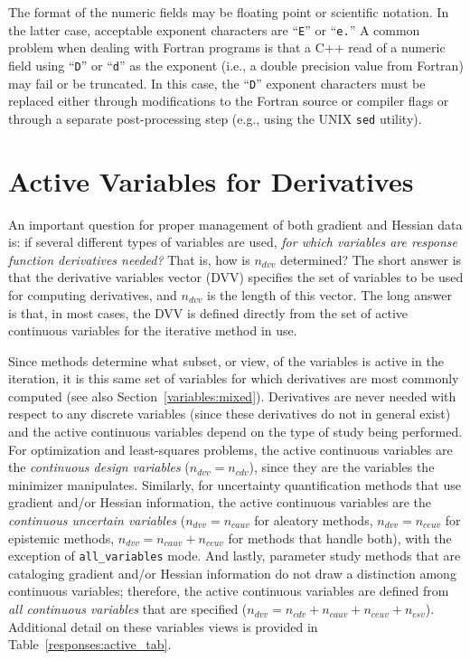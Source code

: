 The format of the numeric fields may be floating point or scientific
notation. In the latter case, acceptable exponent characters are
``\texttt{E}'' or ``\texttt{e.}'' A common problem when dealing with
Fortran programs is that a C++ read of a numeric field using
``\texttt{D}'' or ``\texttt{d}'' as the exponent (i.e., a double
precision value from Fortran) may fail or be truncated. In this case,
the ``\texttt{D}'' exponent characters must be replaced either through
modifications to the Fortran source or compiler flags or through a
separate post-processing step (e.g., using the UNIX \texttt{sed}
utility).

\section{Active Variables for Derivatives}\label{responses:active}

An important question for proper management of both gradient and
Hessian data is: if several different types of variables are used,
\emph{for which variables are response function derivatives needed?}
That is, how is $n_{dvv}$ determined?  The short answer is that the
derivative variables vector (DVV) specifies the set of variables to be
used for computing derivatives, and $n_{dvv}$ is the length of this
vector.  The long answer is that, in most cases, the DVV is defined
directly from the set of active continuous variables for the iterative
method in use.

Since methods determine what subset, or view, of the variables is
active in the iteration, it is this same set of variables for which
derivatives are most commonly computed (see also
Section~\ref{variables:mixed}).  Derivatives are never needed with
respect to any discrete variables (since these derivatives do not in
general exist) and the active continuous variables depend on the type
of study being performed. For optimization and least-squares problems,
the active continuous variables are the \emph{continuous design
  variables} ($n_{dvv}=n_{cdv}$), since they are the variables the
minimizer manipulates.  Similarly, for uncertainty quantification
methods that use gradient and/or Hessian information, the active
continuous variables are the \emph{continuous uncertain variables}
($n_{dvv}=n_{cauv}$ for aleatory methods, $n_{dvv}=n_{ceuv}$ for
epistemic methods, $n_{dvv}=n_{cauv}+n_{ceuv}$ for methods that handle
both), with the exception of \texttt{all\_variables} mode.  And
lastly, parameter study methods that are cataloging gradient and/or
Hessian information do not draw a distinction among continuous
variables; therefore, the active continuous variables are defined from
\emph{all continuous variables} that are specified
($n_{dvv}=n_{cdv}+n_{cauv}+n_{ceuv}+n_{csv}$).  Additional detail on
these variables views is provided in Table~\ref{responses:active_tab}.

